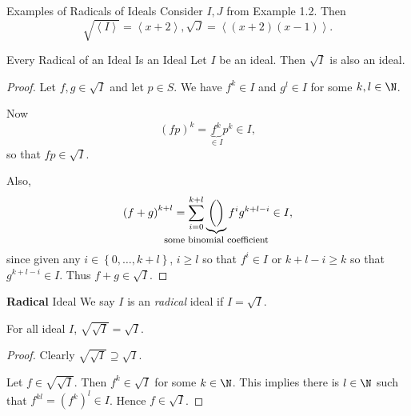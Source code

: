 \documentclass[co439]{subfiles}
\begin{document}
    \begin{example}{Examples of Radicals of Ideals}
        Consider $I,J$ from Example 1.2. Then
        \begin{equation*}
            \sqrt{\left< I \right> } = \left< x+2 \right>, \sqrt{J} = \left< \left( x+2 \right)\left( x-1 \right) \right>.  
        \end{equation*}
    \end{example}

    \rruleline

    \begin{prop}{Every Radical of an Ideal Is an Ideal}
        Let $I$ be an ideal. Then $\sqrt{I}$ is also an ideal.
    \end{prop}

    \begin{proof}
        Let $f,g\in\sqrt{I}$ and let $p\in S$. We have $f^k\in I$ and $g^l\in I$ for some $k,l\in\N$.

        Now
        \begin{equation*}
            \left( fp \right)^k = \underbrace{f^k}_{\in I}p^k \in I,
        \end{equation*}
        so that $fp\in \sqrt{I}$.

        Also,
        \begin{equation*}
            \left( f+g \right)^{k+l} = \sum^{k+l}_{i=0} \underbrace{\binom{}{}}_{\clap{\text{\footnotesize some binomial coefficient}}} f^ig^{k+l-i} \in I,
        \end{equation*}
        since given any $i\in\left\lbrace 0,\ldots,k+l \right\rbrace$, $i\geq l$ so that $f^i\in I$ or $k+l-i\geq k$ so that $g^{k+l-i}\in I$. Thus $f+g\in\sqrt{I}$.
    \end{proof}

    \begin{definition}{\textbf{Radical} Ideal}
        We say $I$ is an \emph{radical} ideal if $I=\sqrt{I}$.
    \end{definition}

    \begin{prop}{}
        For all ideal $I$, $\sqrt{\sqrt{I}} = \sqrt{I}$. 
    \end{prop}

    \begin{proof}
        Clearly $\sqrt{\sqrt{I}} \supseteq \sqrt{I}$.

        Let $f\in \sqrt{\sqrt{I}}$. Then $f^k\in \sqrt{I}$ for some $k\in\N$. This implies there is $l\in\N$ such that $f^{kl} = \left( f^k \right)^l\in I$. Hence $f\in\sqrt{I}$.
    \end{proof}
    
    
    
    
    
    
    
    
    
    
    
    
    
    
    
    
    
    
    
    
    
    
    
    
    
    
    
    
    
    
\end{document}

